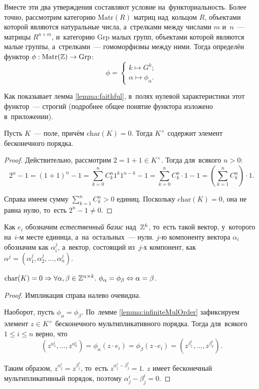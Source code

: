 \documentclass[a4paper,oneside]{article}
\newcommand{\notewrap}[1]{(#1)}
\begin{document}
Вместе эти два утверждения составляют условие на~функториальность. Более точно, рассмотрим категорию
$\mathrm{Matr}(R)$ матриц над~кольцом $R$, объектами которой являются натуральные числа, а~стрелками
между числами $m$ и~$n$~— матрицы $R^{n \times m}$, и~категорию $\mathrm{Grp}$ малых групп,
объектами которой являются малые группы, а~стрелками~— гомоморфизмы между ними.
Тогда определён функтор $\phi : \mathrm{Matr}(\mathbb{Z}) \rightarrow \mathrm{Grp}$:
\[
  \phi = \begin{cases}
    k \mapsto G^k; \\
    \alpha \mapsto \phi_\alpha.
  \end{cases}
\]

Как показывает лемма \ref{lemma:faithful}, в~полях нулевой характеристики этот функтор~— строгий
(подробнее общее понятие функтора изложено в~приложении).

\begin{lemma}
\label{lemma:infiniteMulOrder}
  Пусть $K$~— поле, причём $\mathrm{char}(K) = 0$.
  Тогда $K^\times$ содержит элемент бесконечного порядка.
\end{lemma}

\begin{proof}
  Действительно, рассмотрим $2 = 1 + 1 \in K^\times$. Тогда для~всякого $n > 0$:
  \[
      2^n - 1 = (1 + 1)^n - 1 = \sum_{k = 0}^n C^n_k 1^k 1^{n - k} - 1
                              = \sum_{k = 0}^n C^n_k \cdot 1 - 1
                              = \left(\sum_{k = 1}^n C^n_k \right) \cdot 1.
  \]

  Справа имеем сумму $\sum_{k = 1}^n C^n_k > 0$ единиц. Поскольку $\mathrm{char}(K) = 0$,
  она не равна нулю, то~есть $2^n - 1 \neq 0$.
\end{proof}

Как $e_i$ обозначим \textit{естественный базис} над~$\mathbb{Z}^k$, то~есть такой вектор, у~которого на~$i$-м месте единица, а~на~остальных~— нули.
$j$-ю компоненту вектора $\alpha_i$ обозначим как $\alpha_i^j$, а~вектор, состоящий из~$j$-х компонент,
как $\alpha^j = (\alpha_1^j, \alpha_2^j, \ldots, \alpha_n^j)$.

\begin{lemma}[\notewrap{строгость}]
\label{lemma:faithful}
  $
    \mathrm{char}(K) = 0 \Rightarrow \forall \alpha, \beta \in \mathbb{Z}^{n \times k}.\ \phi_\alpha = \phi_\beta \Leftrightarrow \alpha = \beta
  $.
\end{lemma}

\begin{proof}
  Импликация справа налево очевидна.

  Наоборот, пусть $\phi_\alpha = \phi_\beta$. По~лемме \ref{lemma:infiniteMulOrder} зафиксируем
  элемент $z \in K^\times$ бесконечного мультипликативного порядка.
  Тогда для~всякого $1 \leq i \leq n$ верно, что
  \[
    (z^{\alpha_1^i}, \ldots, z^{\alpha_k^i}) = \phi_\alpha(z \cdot e_i) = \phi_\beta(z \cdot e_i) = (z^{\beta_1^i}, \ldots, z^{\beta_k^i}).
  \]

  Таким образом, $z^{\alpha_j^i} = z^{\beta_j^i}$, то~есть $z^{\alpha_j^i - \beta_j^i} = 1$.
  $z$ имеет бесконечный мультипликативный порядок, поэтому $\alpha_j^i - \beta_j^i = 0$.
\end{proof}
\end{document}

